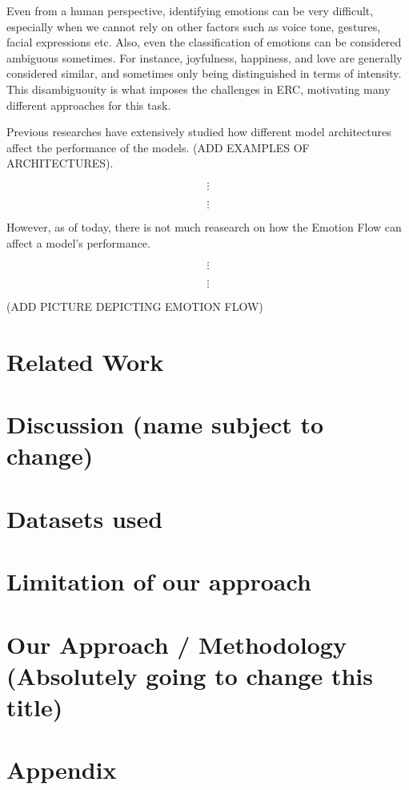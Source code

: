 \documentclass[oneside, a4paper, onecolumn, 11pt]{article}
\begin{document}
Even from a human perspective, identifying emotions can be very difficult, especially when we cannot rely on other factors such
as voice tone, gestures, facial expressions etc. Also, even the classification of emotions can be considered ambiguous sometimes.
For instance, joyfulness, happiness, and love are generally considered similar, and sometimes only being distinguished in terms of
intensity. This disambiguouity is what imposes the challenges in ERC, motivating many different approaches for this task.

Previous researches have extensively studied how different model architectures affect the performance of the models. (ADD EXAMPLES OF 
ARCHITECTURES). 

$$\vdots$$

$$\vdots$$

However, as of today, there is not much reasearch on how the Emotion Flow can affect a model's performance.


$$\vdots$$

$$\vdots$$

(ADD PICTURE DEPICTING EMOTION FLOW)

\section{Related Work} 

\section{Discussion (name subject to change)} %

\section{Datasets used}

\section{Limitation of our approach}
\section{Our Approach / Methodology (Absolutely going to change this title)}

\newpage
\nocite{*}



\newpage
\appendix

\section{Appendix}
\label{sec:appendix}
\end{document}

